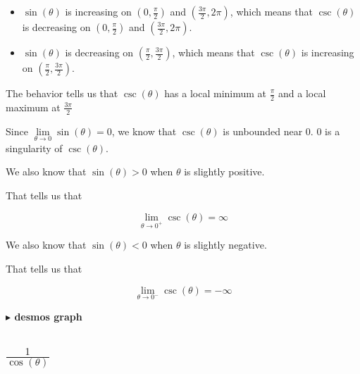 \documentclass{ximera}
\begin{document}
\begin{itemize}
\item $\sin(\theta)$ is increasing on $\left( 0,\frac{\pi}{2} \right)$ and $\left( \frac{3\pi}{2}, 2 \pi \right)$, which means that $\csc(\theta)$ is decreasing on $\left( 0,\frac{\pi}{2} \right)$ and $\left( \frac{3\pi}{2}, 2 \pi \right)$.
\item $\sin(\theta)$ is decreasing on $\left( \frac{\pi}{2}, \frac{3\pi}{2} \right)$, which means that $\csc(\theta)$ is increasing on $\left( \frac{\pi}{2}, \frac{3\pi}{2} \right)$.
\end{itemize}



The behavior tells us that $\csc(\theta)$ has a local minimum at $\frac{\pi}{2}$ and a local maximum at $\frac{3\pi}{2}$





Since $\lim\limits_{\theta \to 0} \sin(\theta) = 0$, we know that $\csc(\theta)$ is unbounded near $0$.  $0$ is a singularity of $\csc(\theta)$.

We also know that $\sin(\theta) > 0$ when $\theta$ is slightly positive.

That tells us that

\[
\lim\limits_{\theta \to 0^+} \csc(\theta) = \infty
\]



We also know that $\sin(\theta) < 0$ when $\theta$ is slightly negative.

That tells us that

\[
\lim\limits_{\theta \to 0^-} \csc(\theta) = -\infty
\]








\textbf{\textcolor{blue!55!black}{$\blacktriangleright$ desmos graph}} 
\begin{center}
\end{center}






















\subsection*{$\frac{1}{\cos(\theta)}$}
\end{document}
